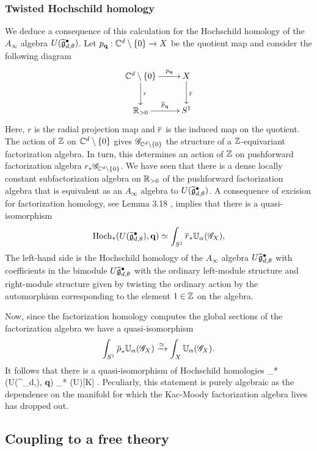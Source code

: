 \subsubsection{Twisted Hochschild homology}
We deduce a consequence of this calculation for the Hochschild homology of the $A_\infty$ algebra $U(\Tilde{\fg}^\bullet_{d,\theta})$.
Let $p_{\bf q} :  \CC^d \setminus \{0\} \to X$ be the quotient map and consider the following diagram
\[
\xymatrix{
\CC^d \setminus \{0\} \ar[r]^-{p_{\bf q}} \ar[d]^-{r} & X \ar[d]^{\Bar{r}} \\
\RR_{>0} \ar[r]^-{\Bar{p}_{\bf q}} & S^1
}
\]
Here, $r$ is the radial projection map and $\Bar{r}$ is the induced map on the quotient.
The action of $\ZZ$ on $\CC^d \setminus\{0\}$ gives $\sG_{\CC^d \setminus \{0\}}$ the structure of a $\ZZ$-equivariant factorization algebra. 
In turn, this determines an action of $\ZZ$ on pushforward factorization algebra $r_* \sG_{\CC^d \setminus \{0\}}$.
We have seen that there is a dense locally constant subfactorization algebra on $\RR_{>0}$ of the pushforward factorization algebra that is equivalent as an $A_\infty$ algebra to $U(\Tilde{\fg}^\bullet_{d,\theta})$.
A consequence of excision for factorization homology, see Lemma 3.18 \cite{AFTopMan}, implies that there is a quasi-isomorphism
\[
\Hoch_*(U(\Tilde{\fg}^\bullet_{d,\theta}), {\bf q}) \simeq \int_{S^1} \Bar{r}_* \UU_\alpha(\sG_X),
\]
The left-hand side is the Hochschild homology of the $A_\infty$ algebra $U \Tilde{\fg}_{d,\theta}^\bullet$ with coefficients in the bimodule $U \Tilde{\fg}_{d, \theta}^\bullet$ with the ordinary left-module structure and right-module structure given by twisting the ordinary action by the automorphism corresponding to the element $1 \in \ZZ$ on the algebra.

Now, since the factorization homology computes the global sections of the factorization algebra we have a quasi-isomorphism
\[
\int_{S^1} \Bar{\rho}_* \UU_\alpha(\sG_X) \xto{\simeq} \int_X \UU_{\alpha} (\sG_X) .
\]
It follows that there is a quasi-isomorphism of Hochschild homologies
\beqn\label{hoch1}
\Hoch_*(U(\Tilde{\fg}^\bullet_{d,\theta}), {\bf q}) \simeq \Hoch_* (U\fg)[K] .
\eeqn
Peculiarly, this statement is purely algebraic as the dependence on the manifold for which the Kac-Moody factorization algebra lives has dropped out.

\subsection{Coupling to a free theory}

